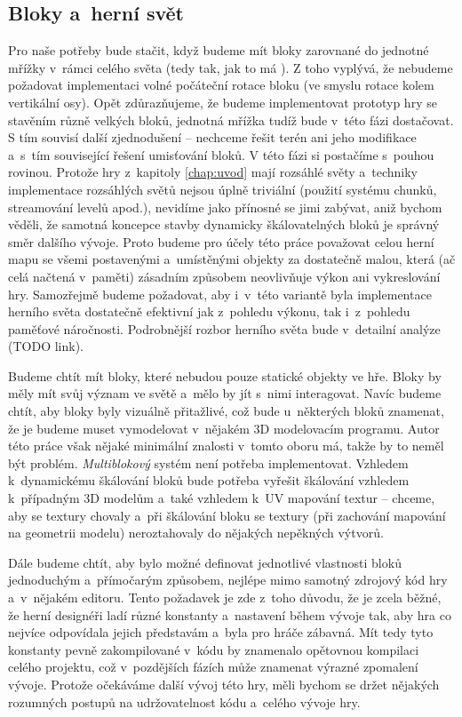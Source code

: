 
\subsection{Bloky a~herní svět}
\label{subsec:bloky}

Pro naše potřeby bude stačit, když budeme mít bloky zarovnané do jednotné mřížky v~rámci celého světa (tedy tak, jak to má \MC{}). Z toho vyplývá, že nebudeme požadovat implementaci volné počáteční rotace bloku (ve smyslu rotace kolem vertikální osy). Opět zdůrazňujeme, že budeme implementovat prototyp hry se stavěním různě velkých bloků, jednotná mřížka tudíž bude v~této fázi dostačovat. S tím souvisí další zjednodušení -- nechceme řešit terén ani jeho modifikace a~s~tím související řešení umisťování bloků. V této fázi si postačíme s~pouhou rovinou. Protože hry z~kapitoly \ref{chap:uvod} mají rozsáhlé světy a~techniky implementace rozsáhlých světů nejsou úplně triviální (použití systému chunků, streamování levelů apod.), nevidíme jako přínosné se jimi zabývat, aniž bychom věděli, že samotná koncepce stavby dynamicky škálovatelných bloků je správný směr dalšího vývoje. Proto budeme pro účely této práce považovat celou herní mapu se všemi postavenými a~umístěnými objekty za dostatečně malou, která (ač celá načtená v~paměti) zásadním způsobem neovlivňuje výkon ani vykreslování hry. Samozřejmě budeme požadovat, aby i~v~této variantě byla implementace herního světa dostatečně efektivní jak z~pohledu výkonu, tak i~z~pohledu paměťové náročnosti. Podrobnější rozbor herního světa bude v~detailní analýze (TODO link).

Budeme chtít mít bloky, které nebudou pouze statické objekty ve hře. Bloky by měly mít svůj význam ve světě a~mělo by jít s~nimi interagovat. Navíc budeme chtít, aby bloky byly vizuálně přitažlivé, což bude u~některých bloků znamenat, že je budeme muset vymodelovat v~nějakém 3D modelovacím programu. Autor této práce však nějaké minimální znalosti v~tomto oboru má, takže by to neměl být problém. \textit{Multiblokový} systém není potřeba implementovat. Vzhledem k~dynamickému škálování bloků bude potřeba vyřešit škálování vzhledem k~případným 3D modelům a~také vzhledem k~UV mapování textur -- chceme, aby se textury chovaly  a~při škálování bloku se textury (při zachování mapování na geometrii modelu) neroztahovaly do nějakých nepěkných výtvorů. 


Dále budeme chtít, aby bylo možné definovat jednotlivé vlastnosti bloků jednoduchým a~přímočarým způsobem, nejlépe mimo samotný zdrojový kód hry a~v~nějakém editoru. Tento požadavek je zde z~toho důvodu, že je zcela běžné, že herní designéři ladí různé konstanty a~nastavení během vývoje tak, aby hra co nejvíce odpovídala jejich představám a~byla pro hráče zábavná. Mít tedy tyto konstanty pevně zakompilované v~kódu by znamenalo opětovnou kompilaci celého projektu, což v~pozdějších fázích může znamenat výrazné zpomalení vývoje. Protože očekáváme další vývoj této hry, měli bychom se držet nějakých rozumných postupů na udržovatelnost kódu a~celého vývoje hry.

